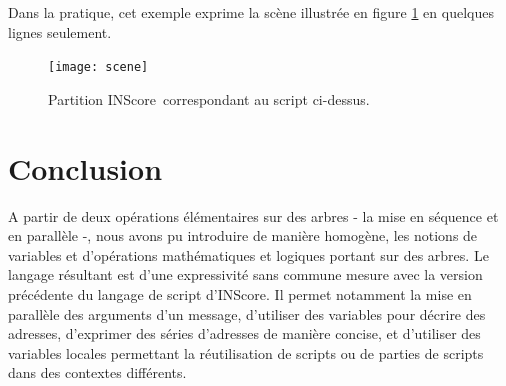 \documentclass{article}
\newcommand{\IS}		{INScore}
\begin{document}
Dans la pratique, cet exemple exprime la scène illustrée en figure \ref{samplescene} en quelques lignes seulement.

\begin{figure}[htbp]
\begin{center}
\texttt{[image: scene]}
\caption{Partition \IS\ correspondant au script ci-dessus.}
\label{samplescene}
\end{center}
\end{figure}


\section{Conclusion}

A partir de deux opérations élémentaires sur des arbres - la mise en séquence et en parallèle -, nous avons pu introduire de manière homogène, les notions de variables et d'opérations mathématiques et logiques portant sur des arbres. Le langage résultant est d'une  expressivité sans commune mesure avec la version précédente du langage de script d'\IS . Il permet notamment la mise en parallèle des arguments d'un message, d'utiliser des variables pour décrire des adresses, d'exprimer des séries d'adresses de manière concise, et d'utiliser des variables locales permettant la réutilisation de scripts ou de parties de scripts dans des contextes différents.

\balance


\end{document}
